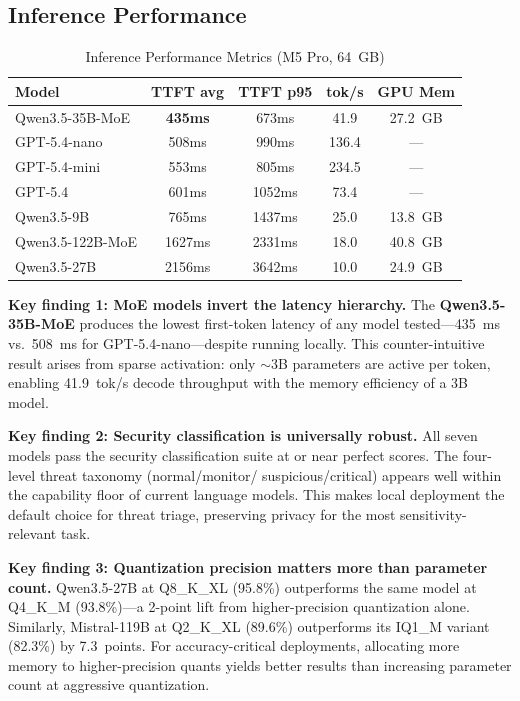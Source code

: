 \documentclass[onecolumn,10pt]{IEEEtran}
\begin{document}
\subsection{Inference Performance}

\begin{table}[h]
\centering
\caption{Inference Performance Metrics (M5 Pro, 64~GB)}
\label{tab:perf}
\small
\begin{tabular}{p{2.5cm}cccc}
\toprule
\textbf{Model} & \textbf{TTFT avg} & \textbf{TTFT p95} & \textbf{tok/s} & \textbf{GPU Mem} \\
\midrule
Qwen3.5-35B-MoE & \textbf{435ms} & 673ms & 41.9 & 27.2~GB \\
GPT-5.4-nano & 508ms & 990ms & 136.4 & --- \\
GPT-5.4-mini & 553ms & 805ms & 234.5 & --- \\
GPT-5.4 & 601ms & 1052ms & 73.4 & --- \\
Qwen3.5-9B & 765ms & 1437ms & 25.0 & 13.8~GB \\
Qwen3.5-122B-MoE & 1627ms & 2331ms & 18.0 & 40.8~GB \\
Qwen3.5-27B & 2156ms & 3642ms & 10.0 & 24.9~GB \\
\bottomrule
\end{tabular}
\end{table}

\textbf{Key finding 1: MoE models invert the latency hierarchy.}
The \textbf{Qwen3.5-35B-MoE} produces the lowest first-token latency
of any model tested---435~ms vs.\ 508~ms for GPT-5.4-nano---despite
running locally. This counter-intuitive result arises from sparse
activation: only $\sim$3B parameters are active per token, enabling
41.9~tok/s decode throughput with the memory efficiency of a 3B model.

\textbf{Key finding 2: Security classification is universally robust.}
All seven models pass the security classification suite at or near
perfect scores. The four-level threat taxonomy (normal/monitor/
suspicious/critical) appears well within the capability floor of
current language models. This makes local deployment the default
choice for threat triage, preserving privacy for the most
sensitivity-relevant task.

\textbf{Key finding 3: Quantization precision matters more than parameter count.}
Qwen3.5-27B at Q8\_K\_XL (95.8\%) outperforms the same model at Q4\_K\_M
(93.8\%)---a 2-point lift from higher-precision quantization alone.
Similarly, Mistral-119B at Q2\_K\_XL (89.6\%) outperforms its IQ1\_M
variant (82.3\%) by 7.3~points. For accuracy-critical deployments,
allocating more memory to higher-precision quants yields better results
than increasing parameter count at aggressive quantization.
\end{document}
